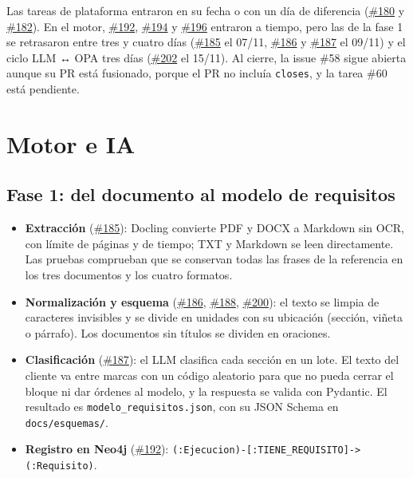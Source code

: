 \documentclass[11pt,a4paper]{report}
\newcommand{\pr}[1]{\href{https://github.com/PracticasESPE/Framework_Desarrollo_Seguro/pull/#1}{\##1}}
\begin{document}
Las tareas de plataforma entraron en su fecha o con un día de diferencia (\pr{180} y \pr{182}).
En el motor, \pr{192}, \pr{194} y \pr{196} entraron a tiempo, pero las de la fase 1 se retrasaron
entre tres y cuatro días (\pr{185} el 07/11, \pr{186} y \pr{187} el 09/11) y el ciclo LLM ↔ OPA
tres días (\pr{202} el 15/11). Al cierre, la issue \#58 sigue abierta aunque su PR está fusionado,
porque el PR no incluía \texttt{closes}, y la tarea \#60 está pendiente.

\section{Motor e IA}

\subsection{Fase 1: del documento al modelo de requisitos}
\begin{itemize}
\item \textbf{Extracción} (\pr{185}): Docling convierte PDF y DOCX a Markdown sin OCR, con límite
de páginas y de tiempo; TXT y Markdown se leen directamente. Las pruebas comprueban que se
conservan todas las frases de la referencia en los tres documentos y los cuatro formatos.
\item \textbf{Normalización y esquema} (\pr{186}, \pr{188}, \pr{200}): el texto se limpia de
caracteres invisibles y se divide en unidades con su ubicación (sección, viñeta o párrafo). Los
documentos sin títulos se dividen en oraciones.
\item \textbf{Clasificación} (\pr{187}): el LLM clasifica cada sección en un lote. El texto del
cliente va entre marcas con un código aleatorio para que no pueda cerrar el bloque ni dar órdenes
al modelo, y la respuesta se valida con Pydantic. El resultado es
\texttt{modelo\_requisitos.json}, con su JSON Schema en \texttt{docs/esquemas/}.
\item \textbf{Registro en Neo4j} (\pr{192}): \texttt{(:Ejecucion)-[:TIENE\_REQUISITO]->(:Requisito)}.
\end{itemize}
\end{document}
